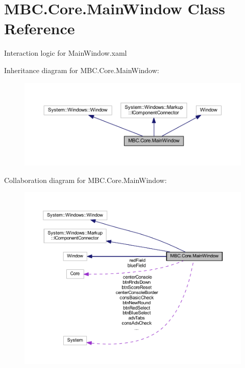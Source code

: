 \hypertarget{class_m_b_c_1_1_core_1_1_main_window}{\section{M\-B\-C.\-Core.\-Main\-Window Class Reference}
\label{class_m_b_c_1_1_core_1_1_main_window}
}


Interaction logic for Main\-Window.\-xaml  




Inheritance diagram for M\-B\-C.\-Core.\-Main\-Window\-:\nopagebreak
\begin{figure}[H]
\begin{center}
\leavevmode
\includegraphics[width=350pt]{class_m_b_c_1_1_core_1_1_main_window__inherit__graph}
\end{center}
\end{figure}


Collaboration diagram for M\-B\-C.\-Core.\-Main\-Window\-:\nopagebreak
\begin{figure}[H]
\begin{center}
\leavevmode
\includegraphics[width=350pt]{class_m_b_c_1_1_core_1_1_main_window__coll__graph}
\end{center}
\end{figure}
